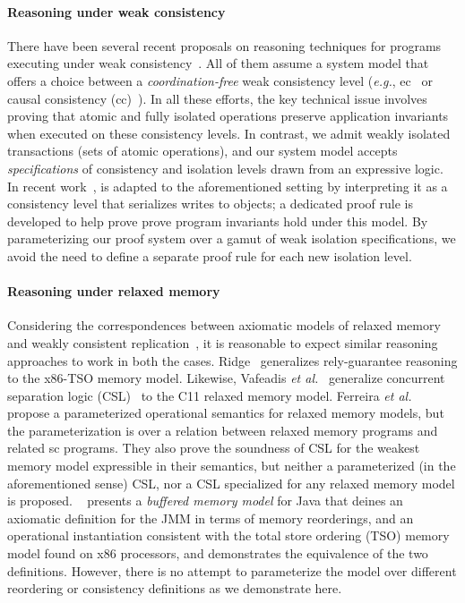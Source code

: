 \paragraph{Reasoning under weak consistency} There have been several
recent proposals on reasoning techniques for programs executing under
weak consistency~\cite{bailisvldb, alvarocalm,
  gotsmanpopl16,redblueatc, redblueosdi, ecinec}. All of them assume a
system model that offers a choice between a \emph{coordination-free}
weak consistency level (\emph{e.g.}, {\sc ec}~\cite{redblueosdi,
  redblueatc, ecinec, alvarocalm, bailisvldb} or causal consistency
({\sc cc})~\cite{gotsmanpopl16}). In all these efforts, the key
technical issue involves proving that atomic and fully isolated
operations preserve application invariants when executed on these
consistency levels.  In contrast, we admit weakly isolated
transactions (sets of atomic operations), and our system model accepts
\emph{specifications} of consistency and isolation levels drawn from
an expressive logic.  In recent work~\cite{gotsmanpopl16},
 is adapted to the aforementioned
setting by interpreting it as a consistency level that serializes
writes to objects; a dedicated proof rule is developed to help prove
prove program invariants hold under this model. By parameterizing our
proof system over a gamut of weak isolation specifications, we avoid
the need to define a separate proof rule for each new isolation level.

\paragraph{Reasoning under relaxed memory} Considering the
correspondences between axiomatic models of relaxed
memory~\cite{battycpp} and weakly consistent
replication~\cite{burckhardt14}, it is reasonable to expect similar
reasoning approaches to work in both the cases. Ridge~\cite{rgtso}
generalizes rely-guarantee reasoning to the x86-TSO memory model.
Likewise, Vafeadis \emph{et al.}~\cite{rsl13} generalize concurrent
separation logic (CSL)~\cite{csl} to the C11 relaxed memory model.
Ferreira \emph{et al.}~\cite{ferreira10} propose a parameterized
operational semantics for relaxed memory models, but the
parameterization is over a relation between relaxed memory programs
and related {\sc sc} programs. They also prove the soundness of CSL
for the weakest memory model expressible in their semantics, but
neither a parameterized (in the aforementioned sense) CSL, nor a CSL
specialized for any relaxed memory model is proposed.  ~\cite{DLZ+13}
presents a \emph{buffered memory model} for Java that deines an
axiomatic definition for the JMM in terms of memory reorderings, and
an operational instantiation consistent with the total store ordering
(TSO) memory model found on x86 processors, and demonstrates the
equivalence of the two definitions.  However, there is no attempt to
parameterize the model over different reordering or consistency
definitions as we demonstrate here.

